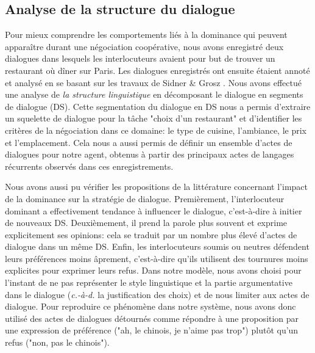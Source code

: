 \documentclass [french]{sig-alternate-05-2015}
\begin{document}
\subsection{Analyse de la structure du dialogue}

Pour mieux comprendre les comportements liés à la dominance qui peuvent apparaître durant une négociation coopérative, nous avons enregistré deux dialogues dans lesquels les interlocuteurs avaient pour but de trouver un restaurant où dîner sur Paris. Les dialogues enregistrés ont ensuite étaient annoté et analysé en se basant sur les travaux de Sidner \& Grosz \cite{grosz1986attention}. Nous avons effectué une analyse de \textit{la structure linguistique}  en décomposant le dialogue en segments de dialogue (DS). Cette segmentation du dialogue en DS nous a permis d'extraire un squelette de dialogue pour la tâche "choix d'un restaurant" et d'identifier les critères de la négociation dans ce domaine: le type de cuisine, l'ambiance, le prix et l'emplacement. Cela nous a aussi permis de définir un ensemble d'actes de dialogues pour notre agent, obtenus à partir des principaux actes de langages récurrents observés dans ces enregistrements.

Nous avons aussi pu vérifier les propositions de la littérature concernant l'impact de la dominance sur la stratégie de dialogue. Premièrement, l'interlocuteur dominant a effectivement tendance à influencer le dialogue, c'est-à-dire à initier de nouveaux DS. Deuxièmement, il prend la parole plus souvent et exprime explicitement ses opinions: cela se traduit par un nombre plus élevé d'actes de dialogue dans un même DS. Enfin, les interlocuteurs soumis ou neutres défendent leurs préférences moins âprement, c'est-à-dire qu'ils utilisent des tournures moins explicites pour exprimer leurs refus. Dans notre modèle, nous avons choisi pour l'instant de ne pas représenter le style linguistique et la partie argumentative dans le dialogue (\emph{c.-à-d.} la justification des choix) et de nous limiter aux actes de dialogue. Pour reproduire ce phénomène dans notre système, nous avons donc utilisé des actes de dialogues détournés comme répondre à une proposition par une expression de préférence ("ah, le chinois, je n'aime pas trop") plutôt qu'un refus ("non, pas le chinois").
\end{document}
